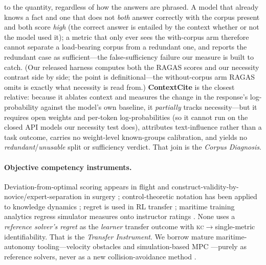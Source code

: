 \documentclass{article}
\newcommand{\kc}{\textsc{kc}}
\begin{document}
to the quantity, regardless of how the answers are phrased. A model that already knows a fact and
one that does not \emph{both} answer correctly with the corpus present and both score \emph{high}
(the correct answer is entailed by the context whether or not the model used it); a metric that
only ever sees the with-corpus arm therefore cannot separate a load-bearing corpus from a
redundant one, and reports the redundant case as sufficient---the false-sufficiency failure our
measure is built to catch. (Our released harness computes both the RAGAS scores and our necessity
contrast side by side; the point is definitional---the without-corpus arm RAGAS omits is exactly
what necessity is read from.) \textbf{ContextCite} \citep{contextcite2024} is the closest relative: because
it ablates context and measures the change in the response's log-probability against the model's own
baseline, it \emph{partially} tracks necessity---but it requires open weights and per-token
log-probabilities (so it cannot run on the closed API models our necessity test does), attributes
text-influence rather than a task outcome, carries no weight-level known-groups calibration, and
yields no \emph{redundant}/\emph{unusable} split or sufficiency verdict. That join is the
\emph{Corpus Diagnosis}.

\paragraph{Objective competency instruments.} Deviation-from-optimal scoring appears in
flight \citep{zinn2023flight} and construct-validity-by-novice/expert-separation in surgery
\citep{vandongen2007lapsim}; control-theoretic notation has been applied to knowledge
dynamics \citep{controlkt2024}; regret is used in RL transfer \citep{transferregret2024};
maritime training analytics regress simulator measures onto instructor ratings
\citep{maritime2025}. None uses a \emph{reference solver's regret} as the
\emph{learner} transfer outcome with \kc$\to$single-metric identifiability. That is the
\emph{Transfer Instrument}.
We borrow mature maritime-autonomy tooling---velocity obstacles \citep{fiorini1998vo} and
simulation-based MPC \citep{johansen2016sbmpc}---purely as reference solvers, never as a new
collision-avoidance method \citep{colregcompliance2024,imo1972colregs}.
\end{document}
